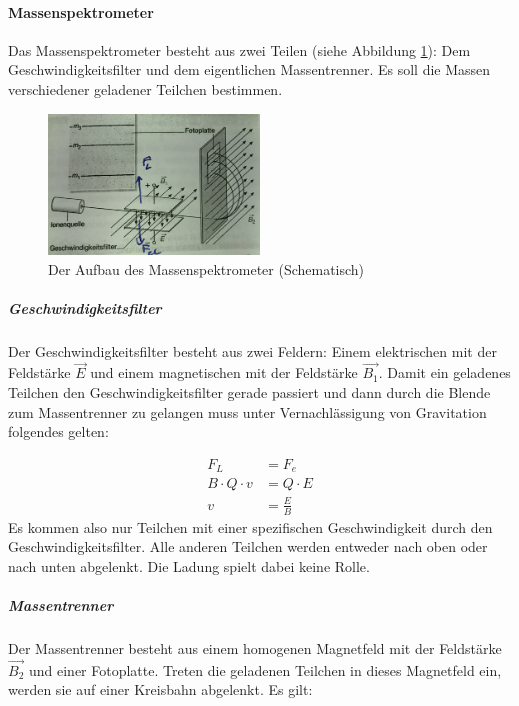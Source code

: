 \documentclass[a4paper]{article}
\begin{document}
		
			
			
			\paragraph{Massenspektrometer}
				Das Massenspektrometer besteht aus zwei Teilen (siehe Abbildung \ref{img:massenspektrometer}): Dem Geschwindigkeitsfilter und dem eigentlichen Massentrenner. Es soll die Massen verschiedener geladener Teilchen bestimmen.
				
				\begin{figure}[ht]
					\centering
					\includegraphics[width=0.5\textwidth]{img/massenspektrometer.jpg}
					\caption{Der Aufbau des Massenspektrometer (Schematisch)}
					\label{img:massenspektrometer}
				\end{figure}
				
				\subparagraph{Geschwindigkeitsfilter} Der Geschwindigkeitsfilter besteht aus zwei Feldern: Einem elektrischen mit der Feldstärke $\vec{E}$ und einem magnetischen mit der Feldstärke $\vec{B_1}$. Damit ein geladenes Teilchen den Geschwindigkeitsfilter gerade passiert und dann durch die Blende zum Massentrenner zu gelangen muss unter Vernachlässigung von Gravitation folgendes gelten:
				
				\begin{equation}
				\begin{aligned} 
					F_L&=F_{e}\\
					B\cdot Q\cdot v &= Q \cdot E\\
					v&=\frac{E}{B}
				\end{aligned}
				\end{equation}
				Es kommen also nur Teilchen mit einer spezifischen Geschwindigkeit durch den Geschwindigkeitsfilter. Alle anderen Teilchen werden entweder nach oben oder nach unten abgelenkt. Die Ladung spielt dabei keine Rolle.
				
				\subparagraph{Massentrenner} Der Massentrenner besteht aus einem homogenen Magnetfeld mit der Feldstärke $\vec{B_2}$ und einer Fotoplatte. Treten die geladenen Teilchen in dieses Magnetfeld ein, werden sie auf einer Kreisbahn abgelenkt. Es gilt:
				
\end{document}
